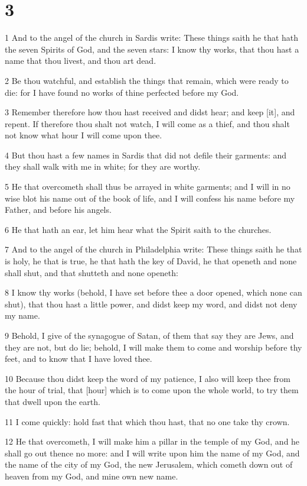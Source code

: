 \chapter{3}

\par 1 And to the angel of the church in Sardis write: These things saith he that hath the seven Spirits of God, and the seven stars: I know thy works, that thou hast a name that thou livest, and thou art dead.
\par 2 Be thou watchful, and establish the things that remain, which were ready to die: for I have found no works of thine perfected before my God.
\par 3 Remember therefore how thou hast received and didst hear; and keep [it], and repent. If therefore thou shalt not watch, I will come as a thief, and thou shalt not know what hour I will come upon thee.
\par 4 But thou hast a few names in Sardis that did not defile their garments: and they shall walk with me in white; for they are worthy.
\par 5 He that overcometh shall thus be arrayed in white garments; and I will in no wise blot his name out of the book of life, and I will confess his name before my Father, and before his angels.
\par 6 He that hath an ear, let him hear what the Spirit saith to the churches.
\par 7 And to the angel of the church in Philadelphia write: These things saith he that is holy, he that is true, he that hath the key of David, he that openeth and none shall shut, and that shutteth and none openeth:
\par 8 I know thy works (behold, I have set before thee a door opened, which none can shut), that thou hast a little power, and didst keep my word, and didst not deny my name.
\par 9 Behold, I give of the synagogue of Satan, of them that say they are Jews, and they are not, but do lie; behold, I will make them to come and worship before thy feet, and to know that I have loved thee.
\par 10 Because thou didst keep the word of my patience, I also will keep thee from the hour of trial, that [hour] which is to come upon the whole world, to try them that dwell upon the earth.
\par 11 I come quickly: hold fast that which thou hast, that no one take thy crown.
\par 12 He that overcometh, I will make him a pillar in the temple of my God, and he shall go out thence no more: and I will write upon him the name of my God, and the name of the city of my God, the new Jerusalem, which cometh down out of heaven from my God, and mine own new name.
